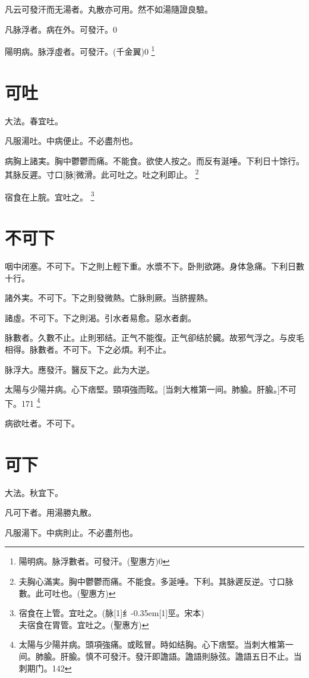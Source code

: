 \documentclass[oneside,b4paper]{ctexbook}
\begin{document}
\begin{flushleft}
凡云可發汗而无湯者。丸散亦可用。然不如湯隨證良驗。

凡脉浮者。病在外。可發汗。0

陽明病。脉浮虛者。可發汗。(千金翼)0
\footnote{陽明病。脉浮數者。可發汗。(聖惠方)0}

\section{可吐}

大法。春宜吐。

凡服湯吐。中病便止。不必盡剂也。

病胸上諸実。胸中鬱鬱而痛。不能食。欲使人按之。而反有涎唾。下利日十馀行。其脉反遲。寸口[脉]微滑。此可吐之。吐之利即止。
\footnote{夫胸心滿実。胸中鬱鬱而痛。不能食。多涎唾。下利。其脉遲反逆。寸口脉數。此可吐也。(聖惠方)}

宿食在上脘。宜吐之。
\footnote{宿食在上管。宜吐之。(脉{\hbox{\scalebox{0.68}[1]{纟}\kern-0.35em\scalebox{0.64}[1]{巠}}}。宋本)\\夫宿食在胃管。宜吐之。(聖惠方)}

\section{不可下}

咽中闭塞。不可下。下之則上輕下重。水漿不下。卧則欲踡。身体急痛。下利日數十行。

諸外実。不可下。下之則發微熱。亡脉則厥。当脐握熱。

諸虛。不可下。下之則渴。引水者易愈。惡水者劇。

脉數者。久數不止。止則邪结。正气不能復。正气卻结於臓。故邪气浮之。与皮毛相得。脉數者。不可下。下之必煩。利不止。

脉浮大。應發汗。醫反下之。此为大逆。

太陽与少陽并病。心下痞堅。頸項強而眩。[当刺大椎第一间。肺腧。肝腧。]不可下。171
\footnote{太陽与少陽并病。頭項強痛。或眩冒。時如结胸。心下痞堅。当刺大椎第一间。肺腧。肝腧。慎不可發汗。發汗即譫語。譫語則脉弦。譫語五日不止。当刺期门。142}

病欲吐者。不可下。

\section{可下}

大法。秋宜下。

凡可下者。用湯勝丸散。

凡服湯下。中病則止。不必盡剂也。


\end{flushleft}
\end{document}

